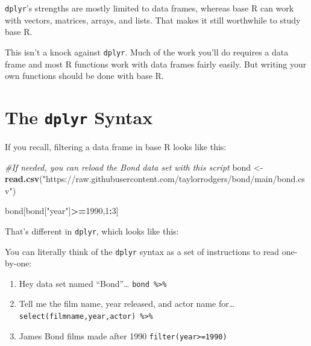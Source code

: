 \documentclass[
]{book}
\newenvironment{Shaded}{\begin{snugshade}}{\end{snugshade}}
\newcommand{\CommentTok}[1]{\textcolor[rgb]{0.56,0.35,0.01}{\textit{#1}}}
\newcommand{\DecValTok}[1]{\textcolor[rgb]{0.00,0.00,0.81}{#1}}
\newcommand{\KeywordTok}[1]{\textcolor[rgb]{0.13,0.29,0.53}{\textbf{#1}}}
\newcommand{\NormalTok}[1]{#1}
\newcommand{\OperatorTok}[1]{\textcolor[rgb]{0.81,0.36,0.00}{\textbf{#1}}}
\newcommand{\StringTok}[1]{\textcolor[rgb]{0.31,0.60,0.02}{#1}}
\providecommand{\tightlist}{%
  \setlength{\itemsep}{0pt}\setlength{\parskip}{0pt}}
\begin{document}
\begin{center}
\texttt{dplyr}'s strengths are mostly limited to data frames, whereas base R can work with vectors, matrices, arrays, and lists. That makes it still worthwhile to study base R.

This isn't a knock against \texttt{dplyr}. Much of the work you'll do requires a data frame and most R functions work with data frames fairly easily. But writing your own functions should be done with base R.

\hypertarget{the-dplyr-syntax}{%
\section{\texorpdfstring{The \texttt{dplyr} Syntax}{The dplyr Syntax}}\label{the-dplyr-syntax}}

If you recall, filtering a data frame in base R looks like this:

\begin{Shaded}
\begin{Highlighting}[]
\CommentTok{#If needed, you can reload the Bond data set with this script}
\NormalTok{bond <-}\StringTok{ }\KeywordTok{read.csv}\NormalTok{(}\StringTok{"https://raw.githubusercontent.com/taylorrodgers/bond/main/bond.csv"}\NormalTok{)}

\NormalTok{bond[bond[}\StringTok{"year"}\NormalTok{]}\OperatorTok{>=}\DecValTok{1990}\NormalTok{,}\DecValTok{1}\OperatorTok{:}\DecValTok{3}\NormalTok{]}
\end{Highlighting}
\end{Shaded}

That's different in \texttt{dplyr}, which looks like this:

\begin{Shaded}
\end{Shaded}

You can literally think of the \texttt{dplyr} syntax as a set of instructions to read one-by-one:

\begin{enumerate}
\def\labelenumi{\arabic{enumi}.}
\tightlist
\item
  Hey data set named ``Bond''\ldots{} \texttt{bond\ \%\textgreater{}\%}
\item
  Tell me the film name, year released, and actor name for\ldots{} \texttt{select(filmname,year,actor)\ \%\textgreater{}\%}
\item
  James Bond films made after 1990 \texttt{filter(year\textgreater{}=1990)}
\end{enumerate}


\end{center}
\end{document}
